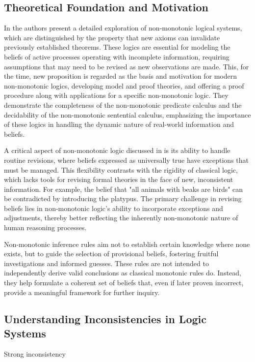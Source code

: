 \subsection{Theoretical Foundation and Motivation}
In \cite{mcdermott_non-monotonic_1980} the authors present a detailed exploration of non-monotonic logical systems, which are distinguished by the property that new axioms can invalidate previously established theorems.
These logics are essential for modeling the beliefs of active processes operating with incomplete information, requiring assumptions that may need to be revised as new observations are made.
This, for the time, new proposition is regarded as the basis and motivation for modern non-monotonic logics, developing model and proof theories, and offering a proof procedure along with applications for a specific non-monotonic logic.
They demonstrate the completeness of the non-monotonic predicate calculus and the decidability of the non-monotonic sentential calculus, emphasizing the importance of these logics in handling the dynamic nature of real-world information and beliefs.

A critical aspect of non-monotonic logic discussed in \cite{mcdermott_non-monotonic_1980} is its ability to handle routine revisions, where beliefs expressed as universally true have exceptions that must be managed.
This flexibility contrasts with the rigidity of classical logic, which lacks tools for revising formal theories in the face of new, inconsistent information.
For example, the belief that "all animals with beaks are birds" can be contradicted by introducing the platypus.
The primary challenge in revising beliefs lies in non-monotonic logic's ability to incorporate exceptions and adjustments, thereby better reflecting the inherently non-monotonic nature of human reasoning processes.

Non-monotonic inference rules aim not to establish certain knowledge where none exists, but to guide the selection of provisional beliefs, fostering fruitful investigations and informed guesses.
These rules are not intended to independently derive valid conclusions as classical monotonic rules do.
Instead, they help formulate a coherent set of beliefs that, even if later proven incorrect, provide a meaningful framework for further inquiry.

\subsection{Understanding Inconsistencies in Logic Systems}
Strong inconsistency \cite{brewka_strong_2019}

